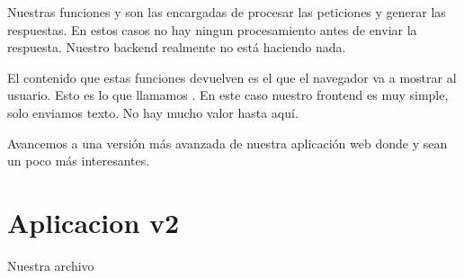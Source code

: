 \documentclass[a5paper,9pt,spanish]{sphinxmanual}
\begin{document}
\sphinxAtStartPar
Nuestras funciones  y  son las encargadas de procesar
las peticiones y generar las respuestas. En estos casos no hay ningun
procesamiento antes de enviar la respuesta. Nuestro backend realmente no
está haciendo nada.

\sphinxAtStartPar
El contenido que estas funciones devuelven es el que el navegador
va a mostrar al usuario. Esto es lo que llamamos .
En este caso nuestro frontend es muy simple, solo enviamos texto.
No hay mucho valor hasta aquí.

\sphinxAtStartPar
Avancemos a una versión más avanzada de nuestra aplicación web
donde  y  sean un poco más interesantes.

\sphinxstepscope


\chapter{Aplicacion v2}
\label{\detokenize{flask-2:aplicacion-v2}}\label{\detokenize{flask-2::doc}}
\sphinxAtStartPar
Nuestra archivo 
\end{document}
